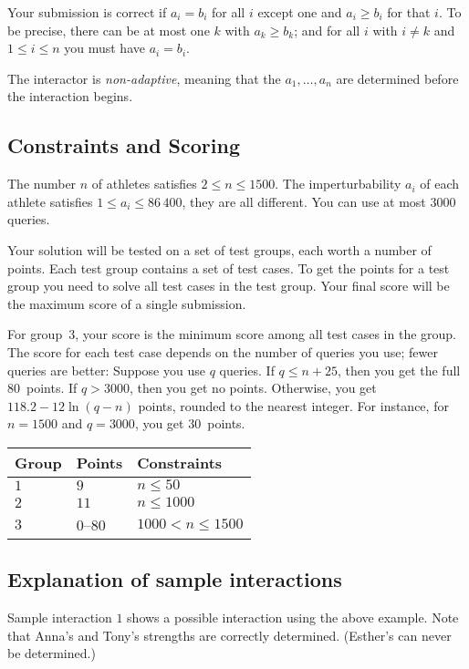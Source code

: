 Your submission is correct if $a_i=b_i$ for all $i$ except one and $a_i \ge b_i$ for that $i$.
To be precise, there can be at most one $k$ with $a_k\geq b_k$;
and for all $i$ with $i\neq k$ and $1\leq i\leq n$ you must have $a_i=b_i$.

The interactor is \emph{non-adaptive}, meaning that the $a_1,\ldots, a_n$ are determined before the interaction begins.

\subsection*{Constraints and Scoring}

The number $n$ of athletes satisfies 
$2\leq n\leq 1500$. %
The imperturbability $a_i$ of each athlete satisfies 
$1\leq a_i\leq 86\,400$, %
they are all different. %
You can use 
at most $3000$ queries. %

Your solution will be tested on a set of test groups, each worth a number of points.
Each test group contains a set of test cases.
To get the points for a test group you need to solve all test cases in the test group.
Your final score will be the maximum score of a single submission.

For group~$3$, your score is the minimum score among all test cases in the group.
The score for each test case depends on the number of queries you use;
fewer queries are better:
Suppose you use $q$ queries. 
If $q \le n+25$, then you get the full $80$~points. 
If $q > 3000$, then you get no points.
Otherwise, you get $118.2 - 12 \ln(q - n)$ points, rounded to the nearest integer.
For instance, for $n = 1500$ and $q = 3000$, you get $30$~points.

\medskip
\begin{tabular}{lll}
Group & Points & Constraints\\\hline
$1$  &  $9$ & $n\leq 50$\\
$2$  &  $11$ & $n\leq 1000$\\
$3$  &  $0$--$80$ & $1000 < n\leq 1500$\\
\end{tabular}

\subsection*{Explanation of sample interactions}

Sample interaction $1$ shows a possible interaction using the above example. 
Note that Anna's and Tony's strengths are correctly determined.
(Esther's can never be determined.)
